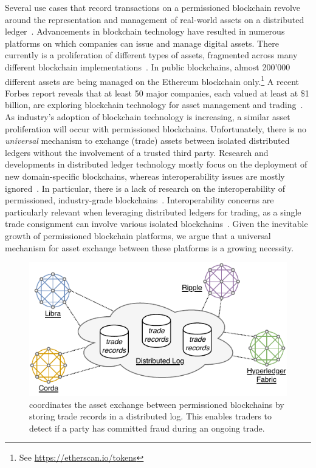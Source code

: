 Several use cases that record transactions on a permissioned blockchain revolve around the representation and management of real-world assets on a distributed ledger~\cite{hewett2019inclusive}.
Advancements in blockchain technology have resulted in numerous platforms on which companies can issue and manage digital assets.
There currently is a proliferation of different types of assets, fragmented across many different blockchain implementations~\cite{borkowski2018towards}.
In public blockchains, almost 200'000 different assets are being managed on the Ethereum blockchain only.\footnote{See \url{https://etherscan.io/tokens}}
A recent Forbes report reveals that at least 50 major companies, each valued at least at \$1 billion, are exploring blockchain technology for asset management and trading~\cite{forbes50companies}.
As industry's adoption of blockchain technology is increasing, a similar asset proliferation will occur with permissioned blockchains.
Unfortunately, there is no \emph{universal} mechanism to exchange (trade) assets between isolated distributed ledgers without the involvement of a trusted third party.
Research and developments in distributed ledger technology mostly focus on the deployment of new domain-specific blockchains, whereas interoperability issues are mostly ignored~\cite{schulte2019towards,yli2016current}.
In particular, there is a lack of research on the interoperability of permissioned, industry-grade blockchains~\cite{nikander2019interledger,vo2018internet}.
Interoperability concerns are particularly relevant when leveraging distributed ledgers for trading, as a single trade consignment can involve various isolated blockchains~\cite{ganne2018can}.
Given the inevitable growth of permissioned blockchain platforms, we argue that a universal mechanism for asset exchange between these platforms is a growing necessity.

\begin{figure}[t]
	\centering
	\includegraphics[width=.8\linewidth]{xchange/assets/xchange_interoperability}
	\caption{\ModelName{} coordinates the asset exchange between permissioned blockchains by storing trade records in a distributed log. This enables traders to detect if a party has committed fraud during an ongoing trade.}
	\label{fig:xchange_interoperability}
\end{figure}

